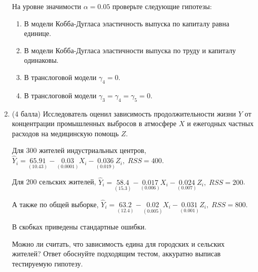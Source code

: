 \documentclass[12pt]{article}
\theoremstyle{definition}
\begin{document}
\begin{enumerate}

На уровне значимости $\alpha = 0.05$ проверьте следующие гипотезы:
\begin{enumerate}
\item В модели Кобба-Дугласа эластичность выпуска по капиталу равна единице.
\item В модели Кобба-Дугласа эластичности выпуска по труду и капиталу одинаковы.
\item В транслоговой модели $\gamma_4=0$.
\item В транслоговой модели $\gamma_3 = \gamma_4 = \gamma_5 = 0$.
\end{enumerate}

\newpage
\item
(4 балла)
Исследователь оценил зависимость продолжительности жизни $Y$ от концентрации  промышленных выбросов в атмосфере $X$ и ежегодных частных расходов на медицинскую помощь $Z$.

Для 300 жителей индустриальных центров, $\hat{Y}_i = \underset{(10.43)}{65.91} - \underset{(0.0001)}{0.03}X_i - \underset{(0.019)}{0.036}Z_i, \; RSS = 400$.

Для 200 сельских жителей, $\hat{Y}_i = \underset{(15.3)}{58.4} - \underset{(0.006)}{0.017}X_i - \underset{(0.007)}{0.024}Z_i, \; RSS = 200$.

А также по общей выборке, $\hat{Y}_i = \underset{(12.4)}{63.2} - \underset{(0.005)}{0.02}X_i - \underset{(0.001)}{0.031}Z_i, \; RSS = 800$.

В скобках приведены стандартные ошибки.

Можно ли считать, что зависимость едина для городских и сельских жителей?
Ответ обоснуйте подходящим тестом, аккуратно выписав тестируемую гипотезу.
\newpage


\end{enumerate}
\end{document}
